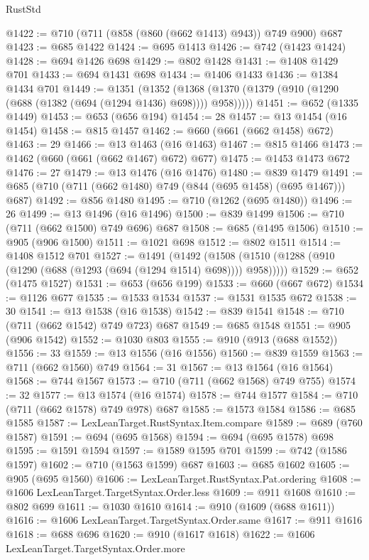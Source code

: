 \begin{lexlean}{RustStd}
\begin{coremodule}
{\begin{coremodule}
{{{{{{{{{{{{{{{{{{{{@1422 := @710 (@711 (@858 (@860 (@662 @1413) @943)) @749 @900) @687
@1423 := @685 @1422
@1424 := @695 @1413
@1426 := @742 (@1423 @1424)
@1428 := @694 @1426 @698
@1429 := @802 @1428
@1431 := @1408 @1429 @701
@1433 := @694 @1431 @698
@1434 := @1406 @1433
@1436 := @1384 @1434 @701
@1449 := @1351
    (@1352 (@1368 (@1370 (@1379 (@910 (@1290 (@688 (@1382 (@694 (@1294 @1436) @698)))) @958)))))
@1451 := @652 (@1335 @1449)
@1453 := @653 (@656 @194)
@1454 := 28
@1457 := @13 @1454 (@16 @1454)
@1458 := @815 @1457
@1462 := @660 (@661 (@662 @1458) @672)
@1463 := 29
@1466 := @13 @1463 (@16 @1463)
@1467 := @815 @1466
@1473 := @1462 (@660 (@661 (@662 @1467) @672) @677)
@1475 := @1453 @1473 @672
@1476 := 27
@1479 := @13 @1476 (@16 @1476)
@1480 := @839 @1479
@1491 := @685 (@710 (@711 (@662 @1480) @749 (@844 (@695 @1458) (@695 @1467))) @687)
@1492 := @856 @1480
@1495 := @710 (@1262 (@695 @1480))
@1496 := 26
@1499 := @13 @1496 (@16 @1496)
@1500 := @839 @1499
@1506 := @710 (@711 (@662 @1500) @749 @696) @687
@1508 := @685 (@1495 @1506)
@1510 := @905 (@906 @1500)
@1511 := @1021 @698
@1512 := @802 @1511
@1514 := @1408 @1512 @701
@1527 := @1491
    (@1492 (@1508 (@1510 (@1288 (@910 (@1290 (@688 (@1293 (@694 (@1294 @1514) @698)))) @958)))))
@1529 := @652 (@1475 @1527)
@1531 := @653 (@656 @199)
@1533 := @660 (@667 @672)
@1534 := @1126 @677
@1535 := @1533 @1534
@1537 := @1531 @1535 @672
@1538 := 30
@1541 := @13 @1538 (@16 @1538)
@1542 := @839 @1541
@1548 := @710 (@711 (@662 @1542) @749 @723) @687
@1549 := @685 @1548
@1551 := @905 (@906 @1542)
@1552 := @1030 @803
@1555 := @910 (@913 (@688 @1552))
@1556 := 33
@1559 := @13 @1556 (@16 @1556)
@1560 := @839 @1559
@1563 := @711 (@662 @1560) @749
@1564 := 31
@1567 := @13 @1564 (@16 @1564)
@1568 := @744 @1567
@1573 := @710 (@711 (@662 @1568) @749 @755)
@1574 := 32
@1577 := @13 @1574 (@16 @1574)
@1578 := @744 @1577
@1584 := @710 (@711 (@662 @1578) @749 @978) @687
@1585 := @1573 @1584
@1586 := @685 @1585
@1587 := LexLeanTarget.RustSyntax.Item.compare
@1589 := @689 (@760 @1587)
@1591 := @694 (@695 @1568)
@1594 := @694 (@695 @1578) @698
@1595 := @1591 @1594
@1597 := @1589 @1595 @701
@1599 := @742 (@1586 @1597)
@1602 := @710 (@1563 @1599) @687
@1603 := @685 @1602
@1605 := @905 (@695 @1560)
@1606 := LexLeanTarget.RustSyntax.Pat.ordering
@1608 := @1606 LexLeanTarget.TargetSyntax.Order.less
@1609 := @911 @1608
@1610 := @802 @699
@1611 := @1030 @1610
@1614 := @910 (@1609 (@688 @1611))
@1616 := @1606 LexLeanTarget.TargetSyntax.Order.same
@1617 := @911 @1616
@1618 := @688 @696
@1620 := @910 (@1617 @1618)
@1622 := @1606 LexLeanTarget.TargetSyntax.Order.more
}}}}}}}}}}}}}}}}}}}}
\end{coremodule}}
\end{coremodule}
\end{lexlean}
